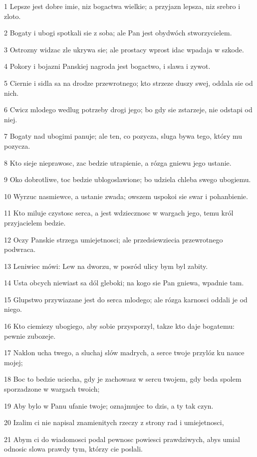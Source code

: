 \par 1 Lepsze jest dobre imie, niz bogactwa wielkie; a przyjazn lepsza, niz srebro i zloto.
\par 2 Bogaty i ubogi spotkali sie z soba; ale Pan jest obydwóch stworzycielem.
\par 3 Ostrozny widzac zle ukrywa sie; ale prostacy wprost idac wpadaja w szkode.
\par 4 Pokory i bojazni Panskiej nagroda jest bogactwo, i slawa i zywot.
\par 5 Ciernie i sidla sa na drodze przewrotnego; kto strzeze duszy swej, oddala sie od nich.
\par 6 Cwicz mlodego wedlug potrzeby drogi jego; bo gdy sie zstarzeje, nie odstapi od niej.
\par 7 Bogaty nad ubogimi panuje; ale ten, co pozycza, sluga bywa tego, który mu pozycza.
\par 8 Kto sieje nieprawosc, zac bedzie utrapienie, a rózga gniewu jego ustanie.
\par 9 Oko dobrotliwe, toc bedzie ublogoslawione; bo udziela chleba swego ubogiemu.
\par 10 Wyrzuc nasmiewce, a ustanie zwada; owszem uspokoi sie swar i pohanbienie.
\par 11 Kto miluje czystosc serca, a jest wdziecznosc w wargach jego, temu król przyjacielem bedzie.
\par 12 Oczy Panskie strzega umiejetnosci; ale przedsiewziecia przewrotnego podwraca.
\par 13 Leniwiec mówi: Lew na dworzu, w posród ulicy bym byl zabity.
\par 14 Usta obcych niewiast sa dól gleboki; na kogo sie Pan gniewa, wpadnie tam.
\par 15 Glupstwo przywiazane jest do serca mlodego; ale rózga karnosci oddali je od niego.
\par 16 Kto ciemiezy ubogiego, aby sobie przysporzyl, takze kto daje bogatemu: pewnie zubozeje.
\par 17 Naklon ucha twego, a sluchaj slów madrych, a serce twoje przylóz ku nauce mojej;
\par 18 Boc to bedzie uciecha, gdy je zachowasz w sercu twojem, gdy beda spolem sporzadzone w wargach twoich;
\par 19 Aby bylo w Panu ufanie twoje; oznajmujec to dzis, a ty tak czyn.
\par 20 Izalim ci nie napisal znamienitych rzeczy z strony rad i umiejetnosci,
\par 21 Abym ci do wiadomosci podal pewnosc powiesci prawdziwych, abys umial odnosic slowa prawdy tym, którzy cie poslali.

